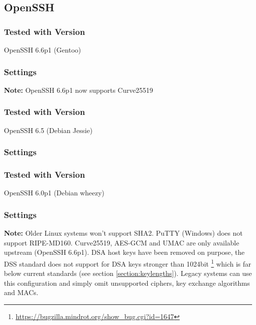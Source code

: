 \subsection{OpenSSH}

\subsubsection{Tested with Version} OpenSSH 6.6p1 (Gentoo)
\subsubsection{Settings}
\textbf{Note:} OpenSSH 6.6p1 now supports Curve25519

\subsubsection{Tested with Version} OpenSSH 6.5 (Debian Jessie)
\subsubsection{Settings}

\subsubsection{Tested with Version} OpenSSH 6.0p1 (Debian wheezy)
\subsubsection{Settings}

\textbf{Note:} Older Linux systems won't support SHA2. PuTTY (Windows) does not support
RIPE-MD160. Curve25519, AES-GCM and UMAC are only available upstream (OpenSSH
6.6p1). DSA host keys have been removed on purpose, the DSS standard does not
support for DSA keys stronger than 1024bit
\footnote{\url{https://bugzilla.mindrot.org/show_bug.cgi?id=1647}} which is far
below current standards (see section \ref{section:keylengths}). Legacy systems
can use this configuration and simply omit unsupported ciphers, key exchange
algorithms and MACs.  

